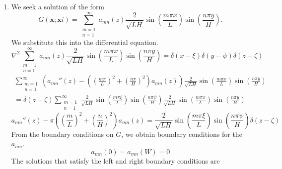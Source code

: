 {\begin{Solution}
\begin{enumerate}
    This determines the Green function.
    \begin{multline*}
      G(\mathbf{x}; \mathbf{x}i) = - \frac{ 2 \sqrt{2 L} }{ \pi } \sum_{n = 1}^\infty 
      \frac{ 1 }{2n-1} 
      \csch \left( \frac{(2n-1)\pi}{2} \right)
      \cosh \left( \frac{(2n-1)\pi y_<}{2 L} \right) 
      \\
      \cosh \left( \frac{(2n-1)\pi (H-y_>)}{2 L} \right)
      \sin \left( \frac{(2n-1)\pi \xi}{2 L} \right)
      \sin \left( \frac{(2n-1)\pi x}{2 L} \right)
    \end{multline*}
  \item
    We seek a solution of the form
    \[
    G(\mathbf{x}; \mathbf{x}i) = \sum_{\substack{m=1\\n=1}}^\infty
    a_{mn}(z) \frac{2}{\sqrt{L H} }
    \sin \left( \frac{ m \pi x }{ L } \right)
    \sin \left( \frac{ n \pi y }{ H } \right).
    \]
    We substitute this into the differential equation.
    \[
    \nabla^2 \sum_{\substack{m=1\\n=1}}^\infty
    a_{mn}(z) \frac{2}{\sqrt{L H} }
    \sin \left( \frac{ m \pi x }{ L } \right)
    \sin \left( \frac{ n \pi y }{ H } \right)
    = \delta(x - \xi) \delta(y - \psi) \delta(z - \zeta)
    \]
    \begin{multline*}
      \sum_{\substack{m=1\\n=1}}^\infty
      \left( a_{m n}''(z) 
        - \left( \left( \frac{ m \pi }{ L } \right)^2 
          + \left( \frac{ n \pi }{ H } \right)^2 \right)
        a_{mn}(z) \right) \frac{2}{\sqrt{L H} }
      \sin \left( \frac{ m \pi x }{ L } \right)
      \sin \left( \frac{ n \pi y }{ H } \right) 
      \\
      = \delta(z - \zeta) \sum_{\substack{m=1\\n=1}}^\infty
      \frac{2}{\sqrt{L H} }
      \sin \left( \frac{ m \pi \xi }{ L } \right)
      \sin \left( \frac{ n \pi \psi }{ H } \right)
      \frac{2}{\sqrt{L H} }
      \sin \left( \frac{ m \pi x }{ L } \right)
      \sin \left( \frac{ n \pi y }{ H } \right)
    \end{multline*}
    \[
    a_{m n}''(z) 
    - \pi \left( \left( \frac{ m }{ L } \right)^2 
      + \left( \frac{ n }{ H } \right)^2 \right) a_{mn}(z)
    = \frac{2}{\sqrt{L H} }
    \sin \left( \frac{ m \pi \xi }{ L } \right)
    \sin \left( \frac{ n \pi \psi }{ H } \right)
    \delta(z - \zeta)
    \]
    From the boundary conditions on $G$, we obtain boundary conditions 
    for the $a_{m n}$.
    \[
    a_{m n}(0) = a_{m n}(W) = 0
    \]
    The solutions that satisfy the left and right boundary conditions are

\end{enumerate}
\end{Solution}}
